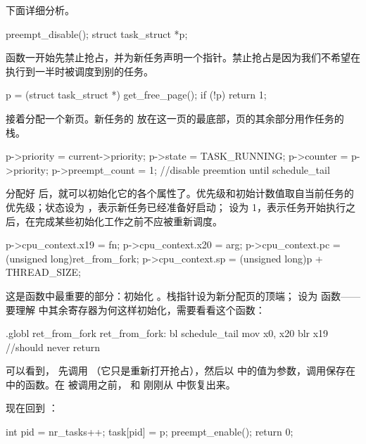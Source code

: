 下面详细分析。

\begin{ccode}
	preempt_disable();
	struct task_struct *p;
\end{ccode}

函数一开始先禁止抢占，并为新任务声明一个指针。禁止抢占是因为我们不希望在  执行到一半时被调度到别的任务。

\begin{ccode}
	p = (struct task_struct *) get_free_page();
	if (!p)
		return 1;
\end{ccode}

接着分配一个新页。新任务的  放在这一页的最底部，页的其余部分用作任务的栈。

\begin{ccode}
	p->priority = current->priority;
	p->state = TASK_RUNNING;
	p->counter = p->priority;
	p->preempt_count = 1; //disable preemtion until schedule_tail
\end{ccode}

分配好  后，就可以初始化它的各个属性了。优先级和初始计数值取自当前任务的优先级；状态设为 ，表示新任务已经准备好启动； 设为 1，表示任务开始执行之后，在完成某些初始化工作之前不应被重新调度。

\begin{ccode}
	p->cpu_context.x19 = fn;
	p->cpu_context.x20 = arg;
	p->cpu_context.pc = (unsigned long)ret_from_fork;
	p->cpu_context.sp = (unsigned long)p + THREAD_SIZE;
\end{ccode}

这是函数中最重要的部分：初始化 。栈指针设为新分配页的顶端； 设为  函数——要理解  中其余寄存器为何这样初始化，需要看看这个函数：

\begin{asmcode}
.globl ret_from_fork
ret_from_fork:
	bl	schedule_tail
	mov	x0, x20
	blr	x19 		//should never return
\end{asmcode}

可以看到， 先调用 （它只是重新打开抢占），然后以  中的值为参数，调用保存在  中的函数。在  被调用之前， 和  刚刚从  中恢复出来。

现在回到 ：

\begin{ccode}
	int pid = nr_tasks++;
	task[pid] = p;
	preempt_enable();
	return 0;
\end{ccode}

